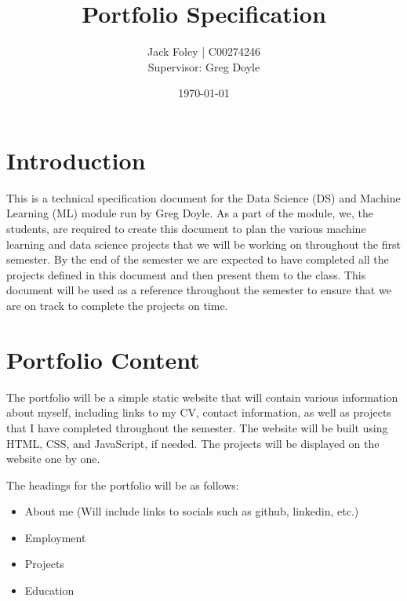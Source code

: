 \documentclass{article}
\title{Portfolio Specification}
\author{Jack Foley | C00274246 \\[1cm]Supervisor: Greg Doyle}
\date{\today}
\begin{document}
\maketitle
\newpage

\tableofcontents

\newpage

\section{Introduction}
This is a technical specification document for the Data Science (DS) and Machine Learning (ML) 
module run by Greg Doyle. As a part of the module, we, the students, are required to 
create this document to plan the various machine learning and data science projects 
that we will be working on throughout the first semester. By the end of the semester
we are expected to have completed all the projects defined in this document and then
present them to the class. This document will be used as a reference throughout the
semester to ensure that we are on track to complete the projects on time. 

\section{Portfolio Content}
The portfolio will be a simple static website that will contain various information about myself, including links to my CV, contact information, as well as projects 
that I have completed throughout the semester. The website will be built using HTML, CSS, and JavaScript, if needed. The projects will be displayed on the website one by one.

The headings for the portfolio will be as follows:
\begin{itemize}
    \item About me (Will include links to socials such as github, linkedin, etc.)
    \item Employment
    \item Projects
    \item Education
\end{itemize}
\end{document}
